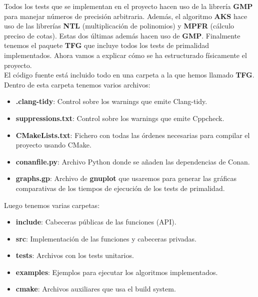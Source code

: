 Todos los tests que se implementan en el proyecto hacen uso de la librería \textbf{GMP} para manejar números de precisión arbitraria. Además, el algoritmo \textbf{AKS} hace uso de las librerías \textbf{NTL} (multiplicación de polinomios) y \textbf{MPFR} (cálculo preciso de cotas). Estas dos últimas además hacen uso de \textbf{GMP}. Finalmente tenemos el paquete \textbf{TFG} que incluye todos los tests de primalidad implementados. Ahora vamos a explicar cómo se ha estructurado físicamente el proyecto.\\

El código fuente está incluido todo en una carpeta a la que hemos llamado \textbf{TFG}. Dentro de esta carpeta tenemos varios archivos:

\begin{itemize}
	\item \textbf{.clang-tidy}: Control sobre los warnings que emite Clang-tidy.
	
	\item \textbf{suppressions.txt}: Control sobre los warnings que emite Cppcheck.
	
	\item \textbf{CMakeLists.txt}: Fichero con todas las órdenes necesarias para compilar el proyecto usando CMake.

	\item \textbf{conanfile.py}: Archivo Python donde se añaden las dependencias de Conan.
	
	\item \textbf{graphs.gp}: Archivo de \textbf{gnuplot} que usaremos para generar las gráficas comparativas de los tiempos de ejecución de los tests de primalidad.
\end{itemize}

Luego tenemos varias carpetas:

\begin{itemize}
	\item \textbf{include}: Cabeceras públicas de las funciones (API).
	
	\item \textbf{src}: Implementación de las funciones y cabeceras privadas.
	
	\item \textbf{tests}: Archivos con los tests unitarios.
	
	\item \textbf{examples}: Ejemplos para ejecutar los algoritmos implementados.
	
	\item \textbf{cmake}: Archivos auxiliares que usa el build system.
\end{itemize}

